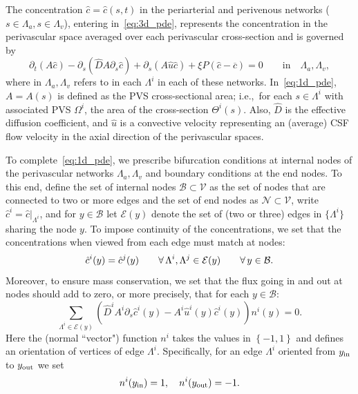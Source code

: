 \documentclass[fleqn,10pt]{wlscirep}
\begin{document}
The concentration $\hat{c} = \hat{c}(s, t)$ in the periarterial and
perivenous networks ($s \in \Lambda_a, s \in \Lambda_v$), entering
in~\eqref{eq:3d_pde}, represents the concentration in the perivascular
space averaged over each perivascular cross-section and is governed by 
\begin{equation}
  \partial_t (A  \hat c) - \partial_s( \hat D A \partial_s \hat c  ) + \partial_s(A \hat u \hat c )  +  \xi P (\hat c - \overline{c}) = 0
  \qquad \text{in} \quad \Lambda_a, \Lambda_v ,
\label{eq:1d_pde}
\end{equation}
where in $\Lambda_a, \Lambda_v$ refers to in each $\Lambda^i$ in each
of these networks. In~\eqref{eq:1d_pde}, $A = A(s)$ is defined as the
PVS cross-sectional area; i.e.,~for each $s \in \Lambda^i$ with
associated PVS $\Omega^i$, the area of the cross-section
$\Theta^i(s)$. Also, $\hat{D}$ is the effective diffusion coefficient,
and $\hat{u}$ is a convective velocity representing an (average) CSF
flow velocity in the axial direction of the perivascular spaces.

To complete~\eqref{eq:1d_pde}, we prescribe bifurcation conditions at
internal nodes of the perivascular networks $\Lambda_a, \Lambda_v$ and
boundary conditions at the end nodes. To this end, define the set of
internal nodes $\mathcal{B} \subset \mathcal{V}$ as the set of nodes
that are connected to two or more edges and the set of end nodes as
$\mathcal{N} \subset \mathcal{V}$, write $\hat{c}^i =
\hat{c}|_{\Lambda^i}$, and for $y\in\mathcal{B}$ let $\mathcal{E}(y)$ denote the set of
(two or three) edges in $\{\Lambda^i\}$ sharing the node $y$. To
impose continuity of the concentrations, we set that the
concentrations when viewed from each edge must match at nodes:
\begin{equation}
  \hat{c}^i (y) = \hat{c}^j(y)
  \qquad \forall \, \Lambda^i, \Lambda^j \in \mathcal{E}(y)
  \qquad \forall \, y \in \mathcal{B} .
  \label{eq:conc_continuity}
\end{equation}
Moreover, to ensure mass conservation, we set that the flux
going in and out at nodes should add to zero, or more precisely, that
for each $y \in \mathcal{B}$:
\begin{equation}
  \sum_{\Lambda^i \in \mathcal{E}(y)}
  \left (\hat{D}^i A^i \partial_s \hat{c}^i (y) - A^i \hat u^i(y) \hat{c}^i(y) \right ) n^i(y)
  = 0.
  \label{eq:flux_conservation}
\end{equation}
Here the (normal ``vector") function $n^i$ takes the values in $\left\{-1, 1\right\}$ and 
defines an orientation of vertices of edge $\Lambda^i$. Specifically, for an edge $\Lambda^i$ oriented from $y_{\rm in}$ to $y_{\rm out}$ we set 
\begin{equation}
  n^i(y_{\rm in}) = 1,\quad
  n^i(y_{\rm{out}}) = -1. %
\label{eq:def:sign}
\end{equation}
\end{document}
